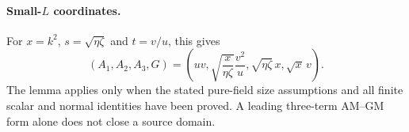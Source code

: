 \paragraph{Small-$L$ coordinates.}
For $x=k^2$, $s=\sqrt{\eta\zeta}$ and $t=v/u$, this gives
\[
 (A_1,A_2,A_3,G)=
 \left(uv,\sqrt{\frac{x}{\eta\zeta}}\frac{v^2}{u},
       \sqrt{\eta\zeta}\,x,\sqrt{x}\,v\right).
\]
The lemma applies only when the stated pure-field size assumptions and
all finite scalar and normal identities have been proved. A leading
three-term AM--GM form alone does not close a source domain.
